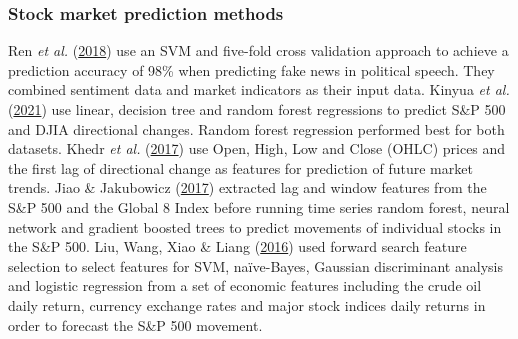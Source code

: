 \documentclass[11pt,preprint, authoryear]{elsarticle}
\numberwithin{equation}{section}
\numberwithin{figure}{section}
\numberwithin{table}{section}
\begin{document}
\hypertarget{stock-market-prediction-methods}{%
\subsubsection{\texorpdfstring{Stock market prediction methods
\label{stockPred}}{Stock market prediction methods }}\label{stock-market-prediction-methods}}

Ren \emph{et al.} (\protect\hyperlink{ref-ren2018forecasting}{2018}) use
an SVM and five-fold cross validation approach to achieve a prediction
accuracy of 98\% when predicting fake news in political speech. They
combined sentiment data and market indicators as their input data.
Kinyua \emph{et al.} (\protect\hyperlink{ref-kinyua2021analysis}{2021})
use linear, decision tree and random forest regressions to predict S\&P
500 and DJIA directional changes. Random forest regression performed
best for both datasets. Khedr \emph{et al.}
(\protect\hyperlink{ref-khedr2017predicting}{2017}) use Open, High, Low
and Close (OHLC) prices and the first lag of directional change as
features for prediction of future market trends. Jiao \& Jakubowicz
(\protect\hyperlink{ref-jiao2017predicting}{2017}) extracted lag and
window features from the S\&P 500 and the Global 8 Index before running
time series random forest, neural network and gradient boosted trees to
predict movements of individual stocks in the S\&P 500. Liu, Wang, Xiao
\& Liang (\protect\hyperlink{ref-liu2016forecasting}{2016}) used forward
search feature selection to select features for SVM, naïve-Bayes,
Gaussian discriminant analysis and logistic regression from a set of
economic features including the crude oil daily return, currency
exchange rates and major stock indices daily returns in order to
forecast the S\&P 500 movement.
\end{document}
